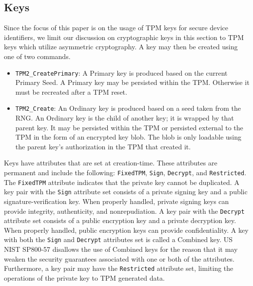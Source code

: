 \subsection{Keys}


Since the focus of this paper is on the usage of TPM keys for secure device identifiers, we limit our discussion on cryptographic keys in this section to TPM keys which utilize asymmetric cryptography.  A key may then be created using one of two commands.
\begin{itemize}
  \item \verb|TPM2_CreatePrimary|: A Primary key is produced based on the current Primary Seed. A Primary key may be persisted within the TPM. Otherwise it must be recreated after a TPM reset.
  \item \verb|TPM2_Create|: An Ordinary key is produced based on a seed taken from the RNG. An Ordinary key is the child of another key; it is wrapped by that parent key. It may be persisted within the TPM or persisted external to the TPM in the form of an encrypted key blob. The blob is only loadable using the parent key's authorization in the TPM that created it.
\end{itemize}
Keys have attributes that are set at creation-time. These attributes are permanent and include the following: \verb|FixedTPM|, \verb|Sign|, \verb|Decrypt|, and \verb|Restricted|. The \verb|FixedTPM| attribute indicates that the private key cannot be duplicated. A key pair with the \verb|Sign| attribute set consists of a private signing key and a public signature-verification key. When properly handled, private signing keys can provide integrity, authenticity, and nonrepudiation. A key pair with the \verb|Decrypt| attribute set consists of a public encryption key and a private decryption key. When properly handled, public encryption keys can provide confidentiality. A key with both the \verb|Sign| and \verb|Decrypt| attributes set is called a Combined key. US NIST SP800-57 disallows the use of Combined keys for the reason that it may weaken the security guarantees associated with one or both of the attributes. Furthermore, a key pair may have the \verb|Restricted| attribute set, limiting the operations of the private key to TPM generated data.

